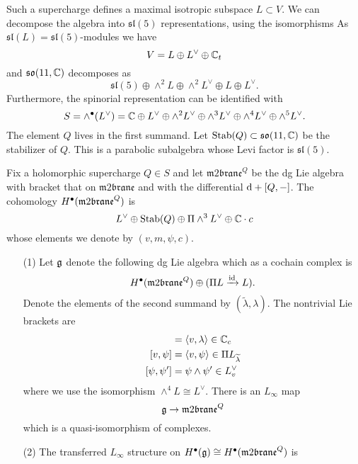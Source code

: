 \documentclass[11pt]{amsart}
\def\m2{\mathfrak{m}2\mathfrak{brane}}
\def\so{\mathfrak{so}}
\def\fsl{\mathfrak{sl}}
\def\lie#1{\ensuremath{\mathfrak{#1}}}
\begin{document}
Such a supercharge defines a maximal isotropic subspace $L \subset V$. 
We can decompose the algebra into $\lie{sl}(5)$ representations, using the isomorphisms
As $\fsl(L) = \fsl(5)$-modules we have
\[
V = L \oplus L^\vee \oplus \mathbb C_t
\]
and $\so(11, \CC)$ decomposes as
\[
\lie{sl}(5) \oplus \wedge^2 L \oplus \wedge^2 L^\vee \oplus L \oplus L^\vee .
\]
Furthermore, the spinorial representation can be identified with
\[
S = \wedge^\bullet (L^\vee) = \mathbb C \oplus L^\vee \oplus \wedge^2 L^\vee \oplus \wedge^3 L^\vee \oplus \wedge^4 L^\vee \oplus \wedge^5 L^\vee .
\]
The element $Q$ lives in the first summand.
Let ${\rm Stab}(Q) \subset \lie{so}(11,\CC)$ be the stabilizer of $Q$. 
This is a parabolic subalgebra whose Levi factor is $\lie{sl}(5)$. 

\begin{prop}\label{prop:model}
Fix a holomorphic supercharge $Q \in S$ and let $\m2^Q$ be the dg Lie algebra with bracket that on $\m2$ and with the differential ${\rm d} + [Q,-]$. 
The cohomology $H^\bu(\m2^Q)$ is
\[
    L^\vee \oplus {\rm Stab}(Q) \oplus \Pi \wedge^3 L^\vee \oplus \mathbb C\cdot c
  \]
whose elements we denote by $(v, m, \psi, c)$. 
\begin{itemize}
\item[(1)] 
Let $\mathfrak g$ denote the following dg Lie algebra which as a cochain complex is
\[
H^\bu(\m2^Q) \oplus (\Pi L \xto{\id} L)  .
\]
Denote the elements of the second summand by $(\tilde{\lambda}, \lambda)$. 
The nontrivial Lie brackets are
\begin{align*}
[v,\lambda] & = \<v, \lambda\> \in \CC_c \\ 
[v,\psi] & = \<v, \psi\> \in \Pi L_{\Tilde{\lambda}} \\
[\psi, \psi'] & = \psi \wedge \psi' \in L^\vee_v 
\end{align*}
where we use the isomorphism $\wedge^4 L \cong L^\vee$.
There is an $L_\infty$ map 
\[
\fg \to \m2^Q
\] 
which is a quasi-isomorphism of complexes.  
\item[(2)]
  The transferred $L_\infty$ structure on $H^\bu(\fg) \cong H^\bu(\m2^Q)$ is 
\end{itemize}
\end{prop}
\end{document}
